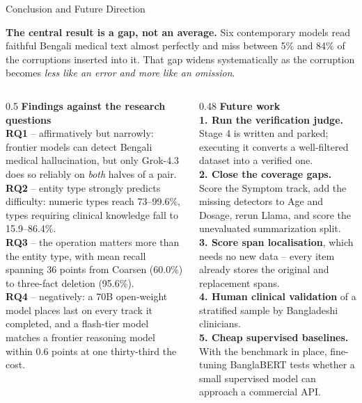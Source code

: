 \documentclass[aspectratio=169,11pt]{beamer}
\begin{document}
\begin{frame}[shrink=12]{Conclusion and Future Direction}
\vspace{-2mm}
{\footnotesize
\textbf{The central result is a gap, not an average.}\;
Six contemporary models read faithful Bengali medical text almost perfectly and miss between 5\% and 84\% of the corruptions inserted into it. That gap widens systematically as the corruption becomes \emph{less like an error and more like an omission}.
\vspace{2mm}
\begin{columns}[T]
\begin{column}{0.5\textwidth}
\textbf{Findings against the research questions}\\[1.5mm]
\textbf{RQ1} -- affirmatively but narrowly: frontier models can detect Bengali medical hallucination, but only Grok-4.3 does so reliably on \emph{both} halves of a pair.\\[1.2mm]
\textbf{RQ2} -- entity type strongly predicts difficulty: numeric types reach 73--99.6\%, types requiring clinical knowledge fall to 15.9--86.4\%.\\[1.2mm]
\textbf{RQ3} -- the operation matters more than the entity type, with mean recall spanning 36 points from Coarsen (60.0\%) to three-fact deletion (95.6\%).\\[1.2mm]
\textbf{RQ4} -- negatively: a 70B open-weight model places last on every track it completed, and a flash-tier model matches a frontier reasoning model within 0.6 points at one thirty-third the cost.
\end{column}
\begin{column}{0.48\textwidth}
\textbf{Future work}\\[1.5mm]
\textbf{1. Run the verification judge.} Stage 4 is written and parked; executing it converts a well-filtered dataset into a verified one.\\[1.2mm]
\textbf{2. Close the coverage gaps.} Score the Symptom track, add the missing detectors to Age and Dosage, rerun Llama, and score the unevaluated summarization split.\\[1.2mm]
\textbf{3. Score span localisation}, which needs no new data -- every item already stores the original and replacement spans.\\[1.2mm]
\textbf{4. Human clinical validation} of a stratified sample by Bangladeshi clinicians.\\[1.2mm]
\textbf{5. Cheap supervised baselines.} With the benchmark in place, fine-tuning BanglaBERT tests whether a small supervised model can approach a commercial API.\\[1.2mm]

\end{column}
\end{columns}}
\end{frame}
\end{document}
